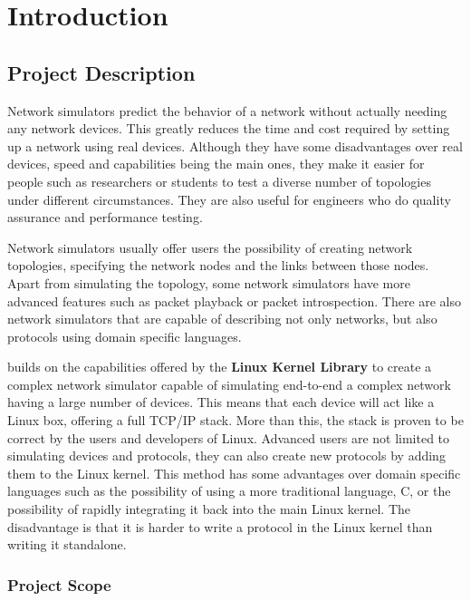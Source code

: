 \chapter{Introduction}
\label{chapter:intro}

\section{Project Description}
\label{sec:proj}

Network simulators predict the behavior of a network without actually needing any network devices.
This greatly reduces the time and cost required by setting up a network using real devices. Although
they have some disadvantages over real devices, speed and capabilities being the main ones, they
make it easier for people such as researchers or students to test a diverse number of topologies under
different circumstances. They are also useful for engineers who do quality assurance and performance
testing.

Network simulators usually offer users the possibility of creating network topologies, specifying the
network nodes and the links between those nodes. Apart from simulating the topology, some network
simulators have more advanced features such as packet playback or packet introspection.
There are also network simulators that are capable of describing not only networks, but also protocols
using domain specific languages.

\textbf{\project} builds on the capabilities offered by the \textbf{Linux Kernel Library} to create
a complex network simulator capable of simulating end-to-end a complex network having a large number
of devices. This means that each device will act like a Linux box, offering a full TCP/IP stack.
More than this, the stack is proven to be correct by the users and developers of Linux. Advanced
users are not limited to simulating devices and protocols, they can also create new protocols by
adding them to the Linux kernel. This method has some advantages over domain specific languages such
as the possibility of using a more traditional language, C, or the possibility of rapidly integrating
it back into the main Linux kernel. The disadvantage is that it is harder to write a protocol
in the Linux kernel than writing it standalone.

\subsection{Project Scope}
\label{sub-sec:proj-scope}


